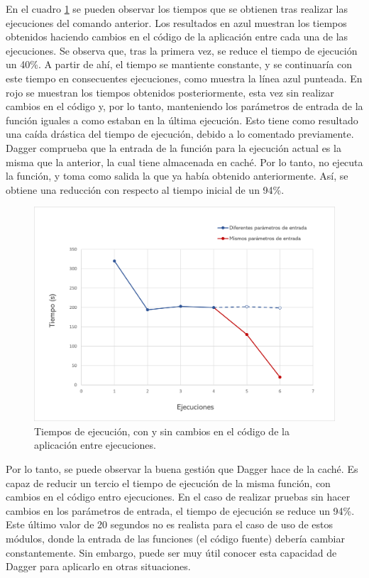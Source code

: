 En el cuadro \ref{fig:times} se pueden observar los tiempos que se obtienen tras realizar las ejecuciones del comando anterior. Los resultados en azul muestran los tiempos obtenidos haciendo cambios en el código de la aplicación entre cada una de las ejecuciones. Se observa que, tras la primera vez, se reduce el tiempo de ejecución un 40\%. A partir de ahí, el tiempo se mantiente constante, y se continuaría con este tiempo en consecuentes ejecuciones, como muestra la línea azul punteada. En rojo se muestran los tiempos obtenidos posteriormente, esta vez sin realizar cambios en el código y, por lo tanto, manteniendo los parámetros de entrada de la función iguales a como estaban en la última ejecución. Esto tiene como resultado una caída drástica del tiempo de ejecución, debido a lo comentado previamente. Dagger comprueba que la entrada de la función para la ejecución actual es la misma que la anterior, la cual tiene almacenada en caché. Por lo tanto, no ejecuta la función, y toma como salida la que ya había obtenido anteriormente. Así, se obtiene una reducción con respecto al tiempo inicial de un 94\%.

\begin{figure}[t]
  \centerline{\includegraphics[width=13cm]{figuras/graph-times}}
  \caption{Tiempos de ejecución, con y sin cambios en el código de la aplicación entre ejecuciones.}
  \label{fig:times}
\end{figure}

Por lo tanto, se puede observar la buena gestión que Dagger hace de la caché. Es capaz de reducir un tercio el tiempo de ejecución de la misma función, con cambios en el código entro ejecuciones. En el caso de realizar pruebas sin hacer cambios en los parámetros de entrada, el tiempo de ejecución se reduce un 94\%. Este último valor de 20 segundos no es realista para el caso de uso de estos módulos, donde la entrada de las funciones (el código fuente) debería cambiar constantemente. Sin embargo, puede ser muy útil conocer esta capacidad de Dagger para aplicarlo en otras situaciones.

